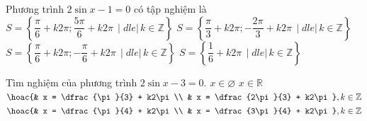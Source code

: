 \begin{ex}%
	Phương trình $2 \sin x - 1 =  0$ có tập nghiệm là
	 \choice
		{\True $S = \left\{ \dfrac{\pi}{6} + k2\pi; \dfrac{5\pi}{6} + k2\pi \,\mid dle|\, k \in \mathbb{Z} \right\}$} 
		{$S = \left\{ \dfrac{\pi}{3}  + k2\pi; -\dfrac{2\pi}{3} + k2\pi \,\mid dle|\, k \in \mathbb{Z} \right\}$}
		{$S = \left\{ \dfrac{\pi}{6} + k2\pi; -\dfrac{\pi}{6} +  k2\pi \,\mid dle|\, k \in \mathbb{Z} \right\}$}
		{$S = \left\{ \dfrac{1}{6} + k2\pi  \,\mid dle|\, k \in \mathbb{Z} \right\}$}
\end{ex}

\begin{ex}%
	Tìm nghiệm của phương trình $2\sin x - 3  = 0$.
	 \choice
		{\True $x \in \varnothing$} 
		{$x \in  \mathbb{R}$}
		{$\hoac{& x  = \dfrac{\pi}{3} + k2\pi \\ & x = \dfrac{2\pi}{3} + k2\pi}, k \in \mathbb{Z}$}
		{$\hoac{& x = \dfrac{\pi}{4} + k2\pi \\ & x = \dfrac{3\pi}{4} + k2\pi}, k \in  \mathbb{Z}$}
\end{ex}

